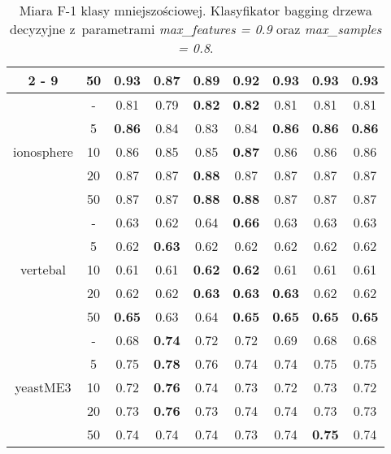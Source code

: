 \begin{table}[H]
\begin{center}
{\begin{tabular}{c|c|ccccccc}
				\cline{2%
					-%
					9}%
				&50&\textbf{0.93}&0.87&0.89&0.92&\textbf{0.93}&\textbf{0.93}&\textbf{0.93}\\%
				\hline%
				\multirow{5}{*}{ionosphere}&{-}&0.81&0.79&\textbf{0.82}&\textbf{0.82}&0.81&0.81&0.81\\%
				\cline{2%
					-%
					9}%
				&5&\textbf{0.86}&0.84&0.83&0.84&\textbf{0.86}&\textbf{0.86}&\textbf{0.86}\\%
				\cline{2%
					-%
					9}%
				&10&0.86&0.85&0.85&\textbf{0.87}&0.86&0.86&0.86\\%
				\cline{2%
					-%
					9}%
				&20&0.87&0.87&\textbf{0.88}&0.87&0.87&0.87&0.87\\%
				\cline{2%
					-%
					9}%
				&50&0.87&0.87&\textbf{0.88}&\textbf{0.88}&0.87&0.87&0.87\\%
				\hline%
				\multirow{5}{*}{vertebal}&{-}&0.63&0.62&0.64&\textbf{0.66}&0.63&0.63&0.63\\%
				\cline{2%
					-%
					9}%
				&5&0.62&\textbf{0.63}&0.62&0.62&0.62&0.62&0.62\\%
				\cline{2%
					-%
					9}%
				&10&0.61&0.61&\textbf{0.62}&\textbf{0.62}&0.61&0.61&0.61\\%
				\cline{2%
					-%
					9}%
				&20&0.62&0.62&\textbf{0.63}&\textbf{0.63}&\textbf{0.63}&0.62&0.62\\%
				\cline{2%
					-%
					9}%
				&50&\textbf{0.65}&0.63&0.64&\textbf{0.65}&\textbf{0.65}&\textbf{0.65}&\textbf{0.65}\\%
				\hline%
				\multirow{5}{*}{yeastME3}&{-}&0.68&\textbf{0.74}&0.72&0.72&0.69&0.68&0.68\\%
				\cline{2%
					-%
					9}%
				&5&0.75&\textbf{0.78}&0.76&0.74&0.74&0.75&0.75\\%
				\cline{2%
					-%
					9}%
				&10&0.72&\textbf{0.76}&0.74&0.73&0.72&0.73&0.72\\%
				\cline{2%
					-%
					9}%
				&20&0.73&\textbf{0.76}&0.73&0.74&0.74&0.73&0.73\\%
				\cline{2%
					-%
					9}%
				&50&0.74&0.74&0.74&0.73&0.74&\textbf{0.75}&0.74\\%
				\hline%
			\end{tabular}}
			\caption{Miara F-1 klasy mniejszościowej. Klasyfikator bagging drzewa decyzyjne z~parametrami \textit{max\_features = 0.9} oraz \textit{max\_samples = 0.8}.}
			\label{baggingdrzewo2f1}
		\end{center}
	\end{table}
	
